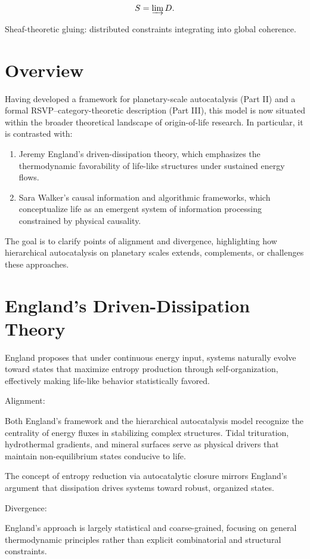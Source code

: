 \documentclass{book}
\begin{document}
\[S = \varinjlim D.\]

Sheaf-theoretic gluing: distributed constraints integrating into global coherence.

\section{Overview}
Having developed a framework for planetary-scale autocatalysis (Part II) and a formal RSVP–category-theoretic description (Part III), this model is now situated within the broader theoretical landscape of origin-of-life research. In particular, it is contrasted with:

\begin{enumerate}
\item Jeremy England’s driven-dissipation theory, which emphasizes the thermodynamic favorability of life-like structures under sustained energy flows.
\item Sara Walker’s causal information and algorithmic frameworks, which conceptualize life as an emergent system of information processing constrained by physical causality.
\end{enumerate}

The goal is to clarify points of alignment and divergence, highlighting how hierarchical autocatalysis on planetary scales extends, complements, or challenges these approaches.

\section{England’s Driven-Dissipation Theory}
England proposes that under continuous energy input, systems naturally evolve toward states that maximize entropy production through self-organization, effectively making life-like behavior statistically favored.

Alignment:

Both England’s framework and the hierarchical autocatalysis model recognize the centrality of energy fluxes in stabilizing complex structures. Tidal trituration, hydrothermal gradients, and mineral surfaces serve as physical drivers that maintain non-equilibrium states conducive to life.

The concept of entropy reduction via autocatalytic closure mirrors England’s argument that dissipation drives systems toward robust, organized states.

Divergence:

England’s approach is largely statistical and coarse-grained, focusing on general thermodynamic principles rather than explicit combinatorial and structural constraints.
\end{document}
